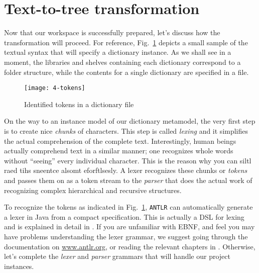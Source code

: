\newpage
\section{Text-to-tree transformation}
\genHeader

Now that our workspace is successfully prepared, let's discuss how the transformation will proceed. For reference, Fig.~\ref{fig:moca-4-Tokens} depicts a small
sample of the textual syntax that will specify a dictionary instance. As we shall see in a moment, the libraries and shelves containing each dictionary correspond to a folder structure, while the
contents for a single dictionary are specified in a file.

\begin{figure}[!htbp]
\begin{center}
 \texttt{[image: 4-tokens]}
  \caption{Identified tokens in a dictionary file}
  \label{fig:moca-4-Tokens}
\end{center}
\end{figure}

On the way to an instance model of our dictionary metamodel, the very first step is to create nice \emph{chunks} of characters. This step is called
\emph{lexing} and it simplifies the actual comprehension of the complete text. Interestingly, human beings actually comprehend text in a similar manner; one
recognizes whole words without ``seeing'' every individual character. This is the reason why you can siltl raed tihs sneentce alsomt eforftlsesly. A lexer
recognizes these chunks or \emph{tokens} and passes them on as a token stream to the \emph{parser} that does the actual work of recognizing complex
hierarchical and recursive structures.
   
To recognize the tokens as indicated in Fig.~\ref{fig:moca-4-Tokens}, \texttt{ANTLR} can automatically generate a lexer in Java from a compact specification.
This is actually a DSL for lexing and is explained in detail in \cite{ANTLR}. If you are unfamiliar with EBNF, and feel you may have problems understanding
the lexer grammar, we suggest going through the documentation on \url{www.antlr.org}, or reading the relevant chapters in \cite{ANTLR}. Otherwise, let's
complete the \emph{lexer} and \emph{parser} grammars that will handle our project instances.

